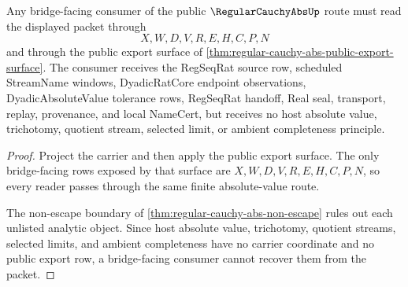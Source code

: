 \begin{theorem}
\label{thm:regular-cauchy-abs-bridge-boundary-reader}
Any bridge-facing consumer of the public $\RegularCauchyAbsUp$ route must read the displayed packet through
$$
X,W,D,V,R,E,H,C,P,N
$$
and through the public export surface of \autoref{thm:regular-cauchy-abs-public-export-surface}. The consumer receives the RegSeqRat source row, scheduled StreamName windows, DyadicRatCore endpoint observations, DyadicAbsoluteValue tolerance rows, RegSeqRat handoff, Real seal, transport, replay, provenance, and local NameCert, but receives no host absolute value, trichotomy, quotient stream, selected limit, or ambient completeness principle.
\end{theorem}
\begin{proof}
Project the carrier and then apply the public export surface. The only bridge-facing rows exposed by that surface are $X,W,D,V,R,E,H,C,P,N$, so every reader passes through the same finite absolute-value route.

The non-escape boundary of \autoref{thm:regular-cauchy-abs-non-escape} rules out each unlisted analytic object. Since host absolute value, trichotomy, quotient streams, selected limits, and ambient completeness have no carrier coordinate and no public export row, a bridge-facing consumer cannot recover them from the packet.
\end{proof}

